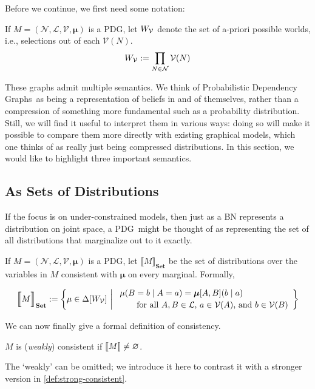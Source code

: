 \documentclass{article}
\newcommand\changeon{\color{note-fg} }
\newcommand\changeoff{\color{black} }
\newcommand{\modelnames}{Probabilistic Dependency Graphs}
\newcommand{\MN}{PDG}%
\newcommand\Set{\textbf{Set}}
\newcommand\bmu{\boldsymbol{\mu}}
\begin{document}
	\changeon
	Before we continue, we first need some notation:
	\begin{defn}
		If $M = (\mathcal N, \mathcal L, \mathcal V, \bmu)$ is a \MN, let $W_{\cal V}$  denote the set of a-priori possible worlds, i.e., selections out of each $\mathcal V(N)$.
		\[ W_{\cal V} := \prod_{N \in \mathcal N}\mathcal V(N) \]
	\end{defn}
	\changeoff
			
	These graphs admit multiple semantics. We think of \modelnames\ as being a representation of beliefs in and of themselves, rather than a compression of something more fundamental such as a probability distribution. Still, we will find it useful to interpret them in various ways: doing so will make it possible to compare them more directly with existing graphical models, which one thinks of as really just being compressed distributions. In this section, we would like to highlight three important semantics.
	
	\subsection{As Sets of Distributions}\label{sec:set-of-distribution-semantics}
	If the focus is on under-constrained models, then just as a BN represents a distribution on joint space, a \MN\ might be thought of as representing the set of all distributions that marginalize out to it exactly. 
	

	
	\begin{defn}
		If $M = (\mathcal N, \mathcal L, \mathcal V, \boldsymbol\mu)$ is a \MN, let $\llbracket M \rrbracket_\Set$ be the set of distributions over the variables in $M$ consistent with $\boldsymbol\mu$ on every marginal. Formally,
		
		\[ \Big\llbracket M \Big\rrbracket_\Set := \left\{\mu \in \Delta[W_{\cal V}] ~\middle|~
		\begin{array}{l}
		\mu(B = b \mid A = a) = \boldsymbol\mu[A,B](b \mid a) \\[0.2em]
		\qquad\text{for all $A, B \in \mathcal L$, $a \in\mathcal V(A)$, and $b \in \mathcal V(B)$} \end{array} \right\}\]
	\end{defn}	

	\changeon
	We can now finally give a formal definition of consistency.
	\begin{defn} \label{def:weak-consistent}
		$M$ is (\emph{weakly}) consistent if $\llbracket M\rrbracket \neq \varnothing$.
	\end{defn}
	The `weakly' can be omitted; we introduce it here to contrast it with a stronger version in \cref{def:strong-consistent}.
	
\end{document}
